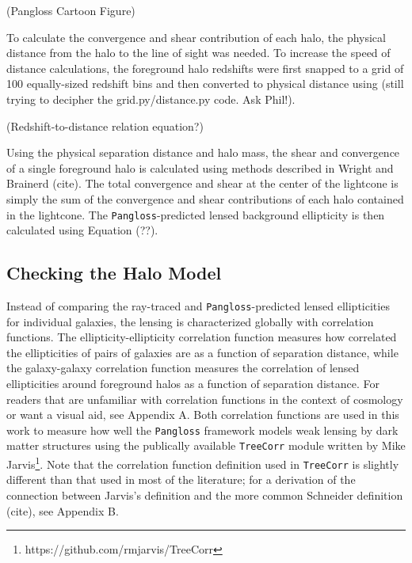 \documentclass[%
 reprint,
 amsmath,amssymb,
 aps,
]{revtex4-1}
\begin{document}
(Pangloss Cartoon Figure)

To calculate the convergence and shear contribution of each halo, the physical distance from the halo to the line of sight was needed. To increase the speed of distance calculations, the foreground halo redshifts were first snapped to a grid of 100 equally-sized redshift bins and then converted to physical distance using (still trying to decipher the grid.py/distance.py code. Ask Phil!).

(Redshift-to-distance relation equation?)

Using the physical separation distance and halo mass, the shear and convergence of a single foreground halo is calculated using methods described in Wright and Brainerd (cite). The total convergence and shear at the center of the lightcone is simply the sum of the convergence and shear contributions of each halo contained in the lightcone. The \texttt{Pangloss}-predicted lensed background ellipticity is then calculated using Equation (??).

\subsection*{Checking the Halo Model}

Instead of comparing the ray-traced and \texttt{Pangloss}-predicted lensed ellipticities for individual galaxies, the lensing is characterized globally with correlation functions. The ellipticity-ellipticity correlation function measures how correlated the ellipticities of pairs of galaxies are as a function of separation distance, while the galaxy-galaxy correlation function measures the correlation of lensed ellipticities around foreground halos as a function of separation distance. For readers that are unfamiliar with correlation functions in the context of cosmology or want a visual aid, see Appendix A. Both correlation functions are used in this work to measure how well the \texttt{Pangloss} framework models weak lensing by dark matter structures using the publically available \texttt{TreeCorr} module written by Mike Jarvis\footnote{https://github.com/rmjarvis/TreeCorr}. Note that the correlation function definition used in \texttt{TreeCorr} is slightly different than that used in most of the literature; for a derivation of the connection between Jarvis's definition and the more common Schneider definition (cite), see Appendix B.
\end{document}
